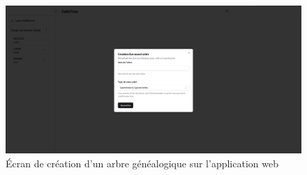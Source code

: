 \begin{figure}[H]
  \centering
  \includegraphics[width=1\textwidth]{capture/tree_creation.png}
  \caption{Écran de création d'un arbre généalogique sur l'application web}
\end{figure}



